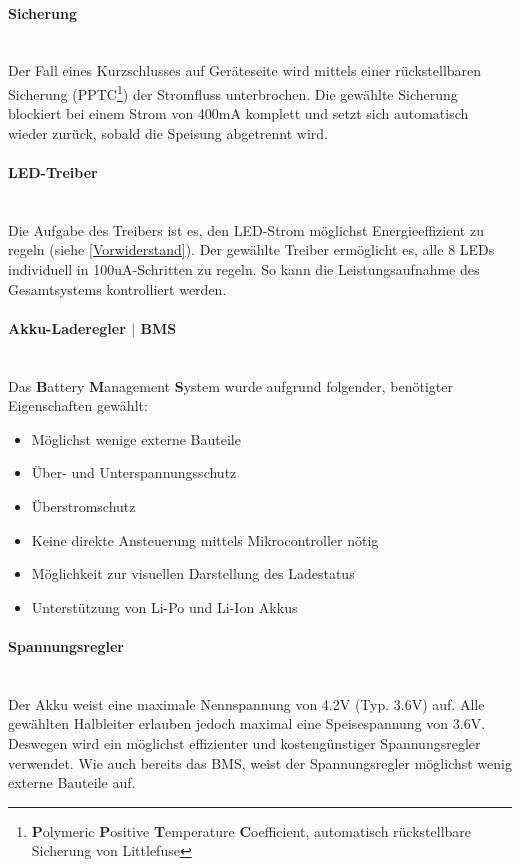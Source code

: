 \documentclass[12pt]{article}
\begin{document}
	\paragraph{Sicherung}\mbox{}\\
	Der Fall eines Kurzschlusses auf Geräteseite wird mittels einer rückstellbaren Sicherung (PPTC\footnote{\textbf{P}olymeric \textbf{P}ositive \textbf{T}emperature \textbf{C}oefficient, automatisch rückstellbare Sicherung von Littlefuse}) der Stromfluss unterbrochen. Die gewählte Sicherung blockiert bei einem Strom von 400mA komplett und setzt sich automatisch wieder zurück, sobald die Speisung abgetrennt wird.
	\paragraph{LED-Treiber} \mbox{}\\
	Die Aufgabe des Treibers ist es, den LED-Strom möglichst Energieeffizient zu regeln (siehe \ref{Vorwiderstand}). Der gewählte Treiber ermöglicht es, alle 8 LEDs individuell in 100uA-Schritten zu regeln. So kann die Leistungsaufnahme des Gesamtsystems kontrolliert werden.
	\paragraph{Akku-Laderegler $\vert$ BMS} \mbox{}\\
	Das \textbf{B}attery \textbf{M}anagement \textbf{S}ystem wurde aufgrund folgender, benötigter Eigenschaften gewählt:
	\begin{itemize}
		\item Möglichst wenige externe Bauteile
		\item Über- und Unterspannungsschutz
		\item Überstromschutz
		\item Keine direkte Ansteuerung mittels Mikrocontroller nötig
		\item Möglichkeit zur visuellen Darstellung des Ladestatus
		\item Unterstützung von Li-Po und Li-Ion Akkus
	\end{itemize}
	\paragraph{Spannungsregler} \mbox{}\\
	Der Akku weist eine maximale Nennspannung von 4.2V (Typ. 3.6V) auf. Alle gewählten Halbleiter erlauben jedoch maximal eine Speisespannung von 3.6V. Deswegen wird ein möglichst effizienter und kostengünstiger Spannungsregler verwendet. Wie auch bereits das BMS, weist der Spannungsregler möglichst wenig externe Bauteile auf.
\end{document}

